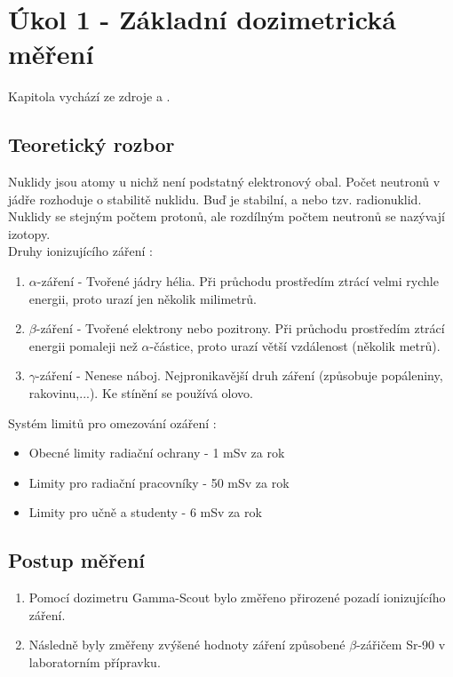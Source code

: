\documentclass[fleqn]{protokol}
\begin{document}
\pagebreak 

\section{Úkol 1 - Základní dozimetrická měření}
    Kapitola vychází ze zdroje \cite{navod} a \cite{vyhlaska}.
\subsection{Teoretický rozbor}
    Nuklidy jsou atomy u nichž není podstatný elektronový obal. Počet neutronů v jádře rozhoduje o stabilitě nuklidu. Buď je stabilní, a nebo tzv. radionuklid. Nuklidy se stejným počtem protonů, ale
    rozdílným počtem neutronů se nazývají izotopy.\\Druhy ionizujícího záření \cite{navod}:
    \begin{enumerate}
        \item $\alpha$-záření - Tvořené jádry hélia. Při průchodu prostředím ztrácí velmi rychle energii, proto urazí jen několik milimetrů.
        \item $\beta$-záření - Tvořené elektrony nebo pozitrony. Při průchodu prostředím ztrácí energii pomaleji než $\alpha$-částice, proto urazí větší vzdálenost (několik metrů).
        \item $\gamma$-záření - Nenese náboj. Nejpronikavější druh záření (způsobuje popáleniny, rakovinu,...). Ke stínění se používá olovo.
    \end{enumerate}
    Systém limitů pro omezování ozáření \cite{vyhlaska}:
    \begin{itemize}
        \item Obecné limity radiační ochrany - 1 mSv za rok
        \item Limity pro radiační pracovníky - 50 mSv za rok
        \item Limity pro učně a studenty - 6 mSv za rok
    \end{itemize}

    \subsection{Postup měření}
    \begin{enumerate}
        \item Pomocí dozimetru Gamma-Scout bylo změřeno přirozené pozadí ionizujícího záření.
        \item Následně byly změřeny zvýšené hodnoty záření způsobené $\beta$-zářičem Sr-90 v laboratorním přípravku.
    \end{enumerate}
\end{document}
